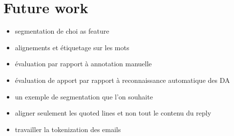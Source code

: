 

\section{Future work}
\label{sec:futureWork}

\begin{itemize}
\item segmentation de choi as feature
\item alignements et étiquetage sur les mots
\item évaluation par rapport à annotation manuelle
\item évaluation de apport par rapport à reconnaissance automatique des DA 
\item un exemple de segmentation que l'on souhaite
\item aligner seulement les quoted lines et non tout le contenu du reply
\item travailler la tokenization des emails

\end{itemize}
